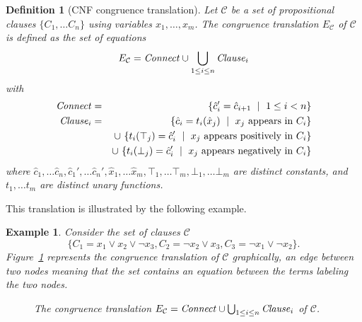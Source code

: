 \documentclass{easychair}
\newtheorem{example}{Example}
\newtheorem{definition}{Definition}
\begin{document}
\newcommand{\Assignment}{{\it Assignment}}
\newcommand{\Clause}{{\it Clause}}
\newcommand{\Connect}{{\it Connect}}

\begin{definition}[CNF congruence translation]

Let $\mathcal{C}$ be a set of propositional clauses $\{C_1,\ldots C_n\}$ using variables $x_1,\ldots,x_m$.
The \emph{congruence translation} $E_{\mathcal{C}}$ of\/ $\mathcal{C}$ is defined as the set of equations
\begin{equation*}
E_{\mathcal{C}} = \Connect \cup \bigcup_{1 \leq i \leq n}\Clause_i 
\end{equation*}
with
\begin{eqnarray*}
	\Connect &=& \{ \hat{c}_{i}' = \hat{c}_{i+1} \ \mid\ 1 \leq i < n\}\\
        \Clause_i &=& \{ \hat{c}_i = t_i(\hat{x}_j) \ \mid\ x_j \text{ appears in } C_i \}\\
           & & \cup\ \{ t_i(\top_j) = \hat{c}_i' \ \mid\ x_j \text{ appears positively in } C_i \}\\
           & & \cup\ \{ t_i(\bot_j) = \hat{c}_i' \ \mid\ x_j \text{ appears negatively in } C_i \}
\end{eqnarray*}
where $\hat{c}_{1},\dots \hat{c}_{n},\hat{c}_{1}', \dots \hat{c}_{n}',
\hat{x}_1, \dots \hat{x}_m, \top_1, \dots \top_m, \bot_1, \dots \bot_m$ are distinct constants, and $t_1, \dots t_m$ are
distinct unary functions.

\end{definition}

\noindent This translation is illustrated by the following example.

\begin{example}\label{ex:np1}
Consider the set of clauses $\mathcal{C}$
\begin{equation*}
\big\{C_1 = x_1 \vee x_2 \vee \neg x_3, C_2 = \neg x_2 \vee x_3, C_3 = \neg x_1 \vee \neg x_2\big\}.
\end{equation*}
Figure~\ref{fig:npexamplebig} represents the congruence translation of
$\mathcal{C}$ graphically, an edge between two nodes meaning that the set
contains an equation between the terms labeling the two nodes.

\begin{figure}[htb]

\caption{The congruence translation $E_{\mathcal{C}} = \Connect \cup \bigcup_{1 \leq i \leq n}\Clause_i$ of $\mathcal{C}$.}
\label{fig:npexamplebig}
\end{figure}

\end{example}
\end{document}
